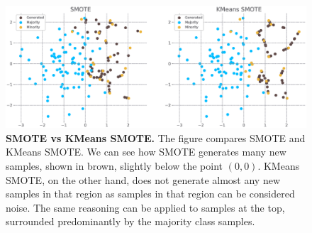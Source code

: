 \begin{figure}
    \centering
    \includegraphics[width=\linewidth]{figures/smote_vs_kmeanssmote.eps}
    \caption{
        \textbf{SMOTE vs KMeans SMOTE.} The figure compares SMOTE and KMeans SMOTE. We can see how
        SMOTE generates many new samples, shown in brown, slightly below the point $(0, 0)$. KMeans
        SMOTE, on the other hand, does not generate almost any new samples in that region as
        samples in that region can be considered noise. The same reasoning can be applied to
        samples at the top, surrounded predominantly by the majority class samples.
    }
    \label{figure:smote-vs-kmeanssmote}
\end{figure}
